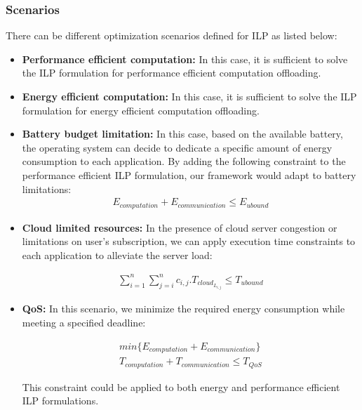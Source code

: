 \subsubsection{Scenarios}
There can be different optimization scenarios defined for ILP as listed below:
\begin{itemize}
\item \textbf{Performance efficient computation:} In this case, it is sufficient to solve the ILP formulation for performance efficient computation offloading.
\item \textbf{Energy efficient computation:} In this case, it is sufficient to solve the ILP formulation for energy efficient computation offloading.
\item \textbf{Battery budget limitation:} In this case, based on the available battery, the operating system can decide to dedicate a specific amount of energy consumption to each application. By adding the following constraint to the performance efficient ILP formulation, our framework would adapt to battery limitations: 
\begin{equation}
\begin{split}
	E_{computation} + E_{communication} \leq E_{ubound}
\end{split}
\end{equation}

\item\textbf{Cloud limited resources:} In the presence of cloud server congestion or limitations on user's subscription, we can apply execution time constraints to each application to alleviate the server load:

\begin{equation}
\begin{split}
\sum_{i=1}^{n}{\sum_{j=i}^{n}{
c_{i,j}.T_{cloud_{L_{i,j}}}}} \leq T_{ubound}
\end{split}
\end{equation}

\item \textbf{QoS:} In this scenario, we minimize the required energy consumption while meeting a specified deadline:

\begin{equation}
      \begin{split}
min\{E_{computation} + E_{communication}\} \\
T_{computation} + T_{communication} \leq T_{QoS}
  \end{split}
\end{equation}


This constraint could be applied to both energy and performance efficient ILP formulations.
\end{itemize}
